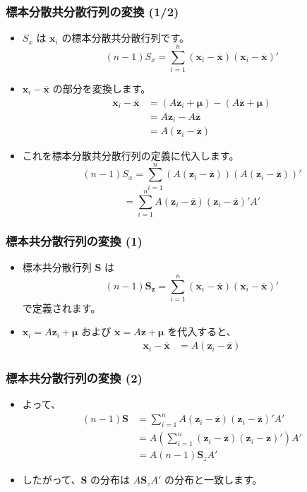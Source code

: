 \documentclass[aspectratio=169]{beamer}
\begin{document}
\begin{frame}
\frametitle{標本分散共分散行列の変換 (1/2)}
\begin{itemize}
    \item $S_x$ は $\bm{x}_i$ の標本分散共分散行列です。
    \[
    (n-1)S_x = \sum_{i=1}^{n} (\bm{x}_i - \overline{\bm{x}})(\bm{x}_i - \overline{\bm{x}})'
    \]
    \item $\bm{x}_i - \overline{\bm{x}}$ の部分を変換します。
    \begin{align*}
        \bm{x}_i - \overline{\bm{x}} &= (A\bm{z}_i + \bm{\mu}) - (A\overline{\bm{z}} + \bm{\mu}) \\
        &= A\bm{z}_i - A\overline{\bm{z}} \\
        &= A(\bm{z}_i - \overline{\bm{z}})
    \end{align*}
    \item これを標本分散共分散行列の定義に代入します。
    \[
    (n-1)S_x = \sum_{i=1}^{n} (A(\bm{z}_i - \overline{\bm{z}}))(A(\bm{z}_i - \overline{\bm{z}}))'
    \]
    \[
    = \sum_{i=1}^{n} A(\bm{z}_i - \overline{\bm{z}})(\bm{z}_i - \overline{\bm{z}})'A'
    \]
\end{itemize}
\end{frame}

\begin{frame}
\frametitle{標本共分散行列の変換 (1)}
\begin{itemize}
    \item 標本共分散行列 $\bm{S}$ は
    \[
    (n-1)\bm{S_z} = \sum_{i=1}^{n} (\bm{x}_i - \overline{\bm{x}})(\bm{x}_i - \overline{\bm{x}})'
    \]
    で定義されます。
    \item $\bm{x}_i = A\bm{z}_i + \bm{\mu}$ および $\overline{\bm{x}} = A\overline{\bm{z}} + \bm{\mu}$ を代入すると、
    \begin{align*}
    \bm{x}_i - \overline{\bm{x}} &= A(\bm{z}_i - \overline{\bm{z}})
    \end{align*}
\end{itemize}
\end{frame}

\begin{frame}
\frametitle{標本共分散行列の変換 (2)}
\begin{itemize}
    \item よって、
    \begin{align*}
    (n-1)\bm{S} &= \sum_{i=1}^{n} A(\bm{z}_i - \overline{\bm{z}})(\bm{z}_i - \overline{\bm{z}})'A' \\
    &= A \left( \sum_{i=1}^{n} (\bm{z}_i - \overline{\bm{z}})(\bm{z}_i - \overline{\bm{z}})' \right) A' \\
    &= A (n-1)\bm{S}_z A'
    \end{align*}
    \item したがって、$\bm{S}$ の分布は $A\bm{S}_zA'$ の分布と一致します。
\end{itemize}
\end{frame}
\end{document}
